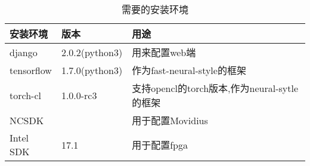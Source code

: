 \begin{table}[H]
\centering
\begin{tabular}{lll}
\toprule
  安装环境&版本&用途\\
\midrule
	django&2.0.2(python3)&用来配置web端\\
	tensorflow&1.7.0(python3) & 作为fast-neural-style的框架\\
	torch-cl&1.0.0-rc3&支持opencl的torch版本,作为neural-sytle的框架\\
	NCSDK&& 用于配置Movidius\\
	Intel SDK&17.1&用于配置fpga \\
\bottomrule
\end{tabular}
\caption{需要的安装环境}
  \label{tbl:environment}
\end{table}
